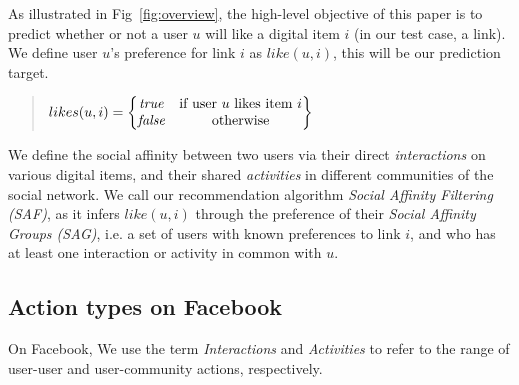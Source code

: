 

As illustrated in Fig~\ref{fig:overview}, the high-level objective of this paper is to predict whether or not a user $u$ will like a digital item $i$ (in our test case, a link). 
We define user $u$'s preference for link $i$ as $like(u,i)$, this will be our prediction target. 
\begin{quote}
\begin{math}
likes(u,i) =  \begin{Bmatrix}
	  \true & \text{if user $u$ likes item $i$}\\
	  \false & \text{otherwise}
	  \end{Bmatrix}
\end{math}
\end{quote}

We define the social affinity between two users via their direct {\em interactions}
on various digital items, and their shared {\em activities} in different communities of the social network. 
We call our recommendation algorithm \textit{Social Affinity Filtering (SAF)}, as it infers 
$like(u,i)$ through the preference of their 
\textit{ Social Affinity Groups (SAG)}, i.e. a set of users with known preferences to link $i$, and who has at least one interaction or activity in common with $u$. 

\subsection{Action types on Facebook}
On Facebook, We use the term {\em Interactions} and {\em Activities} to refer to the range of user-user and user-community actions, respectively.

